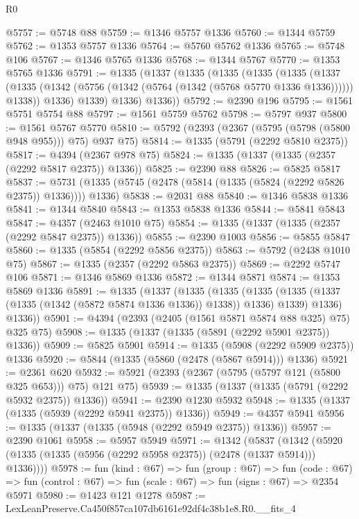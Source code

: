 \begin{lexlean}{R0}
\begin{coremodule}
@5757 := @5748 @88
@5759 := @1346 @5757 @1336
@5760 := @1344 @5759
@5762 := @1353 @5757 @1336
@5764 := @5760 @5762 @1336
@5765 := @5748 @106
@5767 := @1346 @5765 @1336
@5768 := @1344 @5767
@5770 := @1353 @5765 @1336
@5791 := @1335
    (@1337
      (@1335
        (@1335
          (@1335
            (@1335
              (@1337
                (@1335 (@1342 (@5756 (@1342 (@5764 (@1342 (@5768 @5770 @1336 @1336)))))) @1338))
              @1336)
            @1339)
          @1336)
        @1336))
@5792 := @2390 @196
@5795 := @1561 @5751 @5754 @88
@5797 := @1561 @5759 @5762
@5798 := @5797 @937
@5800 := @1561 @5767 @5770
@5810 := @5792 (@2393 (@2367 (@5795 (@5798 (@5800 @948 @955))) @75) @937 @75)
@5814 := @1335 (@5791 (@2292 @5810 @2375))
@5817 := @4394 (@2367 @978 @75)
@5824 := @1335 (@1337 (@1335 (@2357 (@2292 @5817 @2375)) @1336))
@5825 := @2390 @88
@5826 := @5825 @5817
@5837 := @5731 (@1335 (@5745 (@2478 (@5814 (@1335 (@5824 (@2292 @5826 @2375)) @1336)))) @1336)
@5838 := @2031 @88
@5840 := @1346 @5838 @1336
@5841 := @1344 @5840
@5843 := @1353 @5838 @1336
@5844 := @5841 @5843
@5847 := @4357 (@2463 @1010 @75)
@5854 := @1335 (@1337 (@1335 (@2357 (@2292 @5847 @2375)) @1336))
@5855 := @2390 @1003
@5856 := @5855 @5847
@5860 := @1335 (@5854 (@2292 @5856 @2375))
@5863 := @5792 (@2438 @1010 @75)
@5867 := @1335 (@2357 (@2292 @5863 @2375))
@5869 := @2292 @5747 @106
@5871 := @1346 @5869 @1336
@5872 := @1344 @5871
@5874 := @1353 @5869 @1336
@5891 := @1335
    (@1337
      (@1335
        (@1335
          (@1335 (@1335 (@1337 (@1335 (@1342 (@5872 @5874 @1336 @1336)) @1338)) @1336) @1339)
          @1336)
        @1336))
@5901 := @4394 (@2393 (@2405 (@1561 @5871 @5874 @88 @325) @75) @325 @75)
@5908 := @1335 (@1337 (@1335 (@5891 (@2292 @5901 @2375)) @1336))
@5909 := @5825 @5901
@5914 := @1335 (@5908 (@2292 @5909 @2375)) @1336
@5920 := @5844 (@1335 (@5860 (@2478 (@5867 @5914))) @1336)
@5921 := @2361 @620
@5932 := @5921 (@2393 (@2367 (@5795 (@5797 @121 (@5800 @325 @653))) @75) @121 @75)
@5939 := @1335 (@1337 (@1335 (@5791 (@2292 @5932 @2375)) @1336))
@5941 := @2390 @1230 @5932
@5948 := @1335 (@1337 (@1335 (@5939 (@2292 @5941 @2375)) @1336))
@5949 := @4357 @5941
@5956 := @1335 (@1337 (@1335 (@5948 (@2292 @5949 @2375)) @1336))
@5957 := @2390 @1061
@5958 := @5957 @5949
@5971 := @1342
    (@5837 (@1342 (@5920 (@1335 (@1335 (@5956 (@2292 @5958 @2375)) (@2478 (@1337 @5914))) @1336))))
@5978 := fun (kind : @67) =>
  fun (group : @67) =>
  fun (code : @67) => fun (control : @67) => fun (scale : @67) => fun (signs : @67) => @2354 @5971
@5980 := @1423 @121 @1278
@5987 := LexLeanPreserve.Ca450f857ca107db6161e92df4c38b1e8.R0.__fits_4

\end{coremodule}
\end{lexlean}
